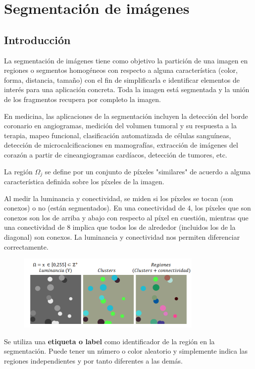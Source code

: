\chapter{Segmentación de imágenes}
\section{Introducción}
La segmentación de imágenes tiene como objetivo la partición de una imagen en regiones o segmentos homogéneos con respecto a alguna característica (color, forma, distancia, tamaño) con el fin de simplificarla e identificar elementos de interés para una aplicación concreta. Toda la imagen está segmentada y la unión de los fragmentos recupera por completo la imagen.

En medicina, las aplicaciones de la segmentación incluyen la detección del borde coronario en angiogramas, medición del volumen tumoral y su respuesta a la terapia, mapeo funcional, clasificación automatizada de células sanguíneas, detección de microcalcificaciones en mamografías, extracción de imágenes del corazón a partir de cineangiogramas cardíacos, detección de tumores, etc.

La región $\Omega_j$ se define por un conjunto de píxeles "similares" de acuerdo a alguna característica definida sobre los píxeles de la imagen. 

Al medir la luminancia y conectividad, se miden si los píxeles se tocan (son conexos) o no (están segmentados). En una conectividad de 4, los píxeles que son conexos son los de arriba y abajo con respecto al píxel en cuestión, mientras que una conectividad de 8 implica que todos los de alrededor (incluidos los de la diagonal) son conexos. La luminancia y conectividad nos permiten diferenciar correctamente.

\begin{figure}[h]
\centering
\includegraphics[width = 0.8\textwidth]{figs/luminancia-conectividad.png}
\end{figure}

Se utiliza una \textbf{etiqueta o label} como identificador de la región en la segmentación. Puede tener un número o color aleatorio y simplemente indica las regiones independientes y por tanto diferentes a las demás. 

